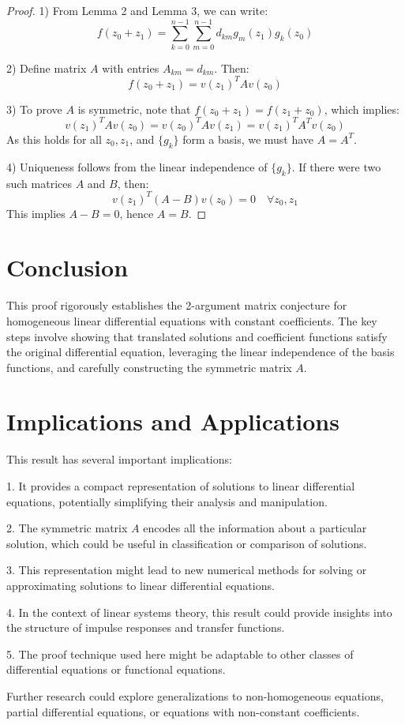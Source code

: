 \documentclass{article}
\begin{document}
\begin{proof}
1) From Lemma 2 and Lemma 3, we can write:
\[
f(z_0 + z_1) = \sum_{k=0}^{n-1} \sum_{m=0}^{n-1} d_{km} g_m(z_1) g_k(z_0)
\]

2) Define matrix $A$ with entries $A_{km} = d_{km}$. Then:
\[
f(z_0 + z_1) = v(z_1)^T A v(z_0)
\]

3) To prove $A$ is symmetric, note that $f(z_0 + z_1) = f(z_1 + z_0)$, which implies:
\[
v(z_1)^T A v(z_0) = v(z_0)^T A v(z_1) = v(z_1)^T A^T v(z_0)
\]
As this holds for all $z_0, z_1$, and $\{g_k\}$ form a basis, we must have $A = A^T$.

4) Uniqueness follows from the linear independence of $\{g_k\}$. If there were two such matrices $A$ and $B$, then:
\[
v(z_1)^T (A-B) v(z_0) = 0 \quad \forall z_0, z_1
\]
This implies $A-B = 0$, hence $A = B$.
\end{proof}

\section{Conclusion}

This proof rigorously establishes the 2-argument matrix conjecture for homogeneous linear differential equations with constant coefficients. The key steps involve showing that translated solutions and coefficient functions satisfy the original differential equation, leveraging the linear independence of the basis functions, and carefully constructing the symmetric matrix $A$.

\section{Implications and Applications}

This result has several important implications:

1. It provides a compact representation of solutions to linear differential equations, potentially simplifying their analysis and manipulation.

2. The symmetric matrix $A$ encodes all the information about a particular solution, which could be useful in classification or comparison of solutions.

3. This representation might lead to new numerical methods for solving or approximating solutions to linear differential equations.

4. In the context of linear systems theory, this result could provide insights into the structure of impulse responses and transfer functions.

5. The proof technique used here might be adaptable to other classes of differential equations or functional equations.

Further research could explore generalizations to non-homogeneous equations, partial differential equations, or equations with non-constant coefficients.
\end{document}
